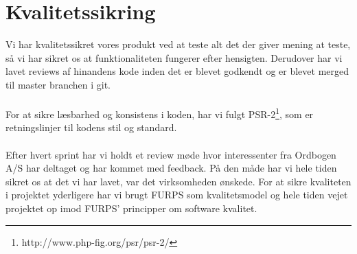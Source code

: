 \section{Kvalitetssikring}
Vi har kvalitetssikret vores produkt ved at teste alt det der giver mening at teste,
så vi har sikret os at funktionaliteten fungerer efter hensigten. Derudover har vi lavet reviews af hinandens kode inden
det er blevet godkendt og er blevet merged til master branchen i git.
\\\\
For at sikre læsbarhed og konsistens i koden, har vi fulgt PSR-2\footnote{http://www.php-fig.org/psr/psr-2/}, som er retningslinjer til kodens stil og standard.
\\\\
Efter hvert sprint har vi holdt et review møde hvor interessenter fra Ordbogen A/S har deltaget og har kommet med feedback.
På den måde har vi hele tiden sikret os at det vi har lavet, var det virksomheden ønskede.
For at sikre kvaliteten i projektet yderligere har vi brugt FURPS som kvalitetsmodel og hele tiden
vejet projektet op imod FURPS' principper om software kvalitet.
